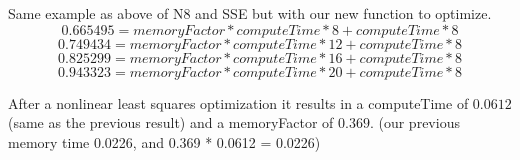 Same example as above of N8 and SSE but with our new function to optimize.
\[0.665495 = memoryFactor * computeTime * 8  + computeTime * 8 \]
\[0.749434 = memoryFactor * computeTime * 12 + computeTime * 8 \]
\[0.825299 = memoryFactor * computeTime * 16 + computeTime * 8 \]
\[0.943323 = memoryFactor * computeTime * 20 + computeTime * 8 \]

After a nonlinear least squares optimization it results in a computeTime of $0.0612$ (same as the previous result) and a memoryFactor of $0.369$. (our previous memory time 0.0226, and 0.369 * 0.0612 = 0.0226)


\begin{minipage}[t]{0.8\textwidth}
\end{minipage}